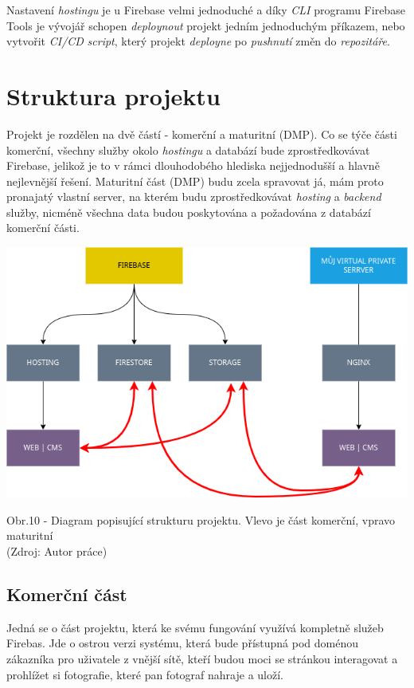 \documentclass[12pt,a4paper]{report}
\begin{document}
  Nastavení \emph{hostingu} je u Firebase velmi jednoduché a díky \emph{CLI} programu Firebase Tools je vývojář schopen
  \emph{deploynout} projekt jedním jednoduchým příkazem, nebo vytvořit \emph{CI/CD} \emph{script}, který projekt \emph{deployne} po 
  \emph{pushnutí} změn do \emph{repozitáře}. 

  \chapter{Struktura projektu}
  Projekt je rozdělen na dvě částí - komerční a maturitní (DMP). Co se týče části komerční, všechny
  služby okolo \emph{hostingu} a databází bude zprostředkovávat Firebase, jelikož je to v rámci
  dlouhodobého hlediska nejjednodušší a hlavně nejlevnější řešení. Maturitní část (DMP) budu zcela
  spravovat já, mám proto pronajatý vlastní server, na kterém budu zprostředkovávat \emph{hosting} a
  \emph{backend} služby, nicméně všechna data budou poskytována a požadována z databází komerční
  části.
 
  \vspace*{0.5cm}
  \noindent\includegraphics[width=\linewidth]{project_structure.png}
  \begin{center}
    Obr.10 -  Diagram popisující strukturu projektu. Vlevo je část komerční, vpravo maturitní \\
    (Zdroj: Autor práce)
  \end{center}
  \vspace*{0.5cm}
  
  \section{Komerční část}
  Jedná se o část projektu, která ke svému fungování využívá kompletně služeb Firebas.
  Jde o ostrou verzi systému, která bude přístupná pod doménou zákazníka pro uživatele z vnější sítě, kteří budou moci se stránkou 
  interagovat a prohlížet si fotografie, které pan fotograf nahraje a uloží.
\end{document}
